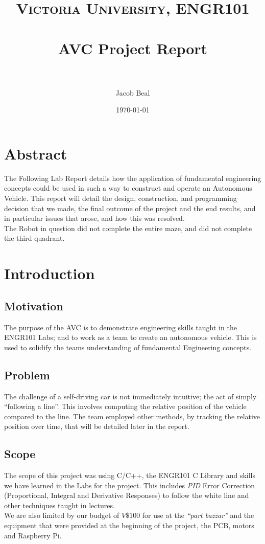 \documentclass[paper=a4, fontsize=11pt]{scrartcl} %
\title{
\normalfont\normalsize
\textsc{Victoria University, ENGR101} \\ [25pt] %
\horrule{0.5pt} \\[0.4cm] %
\huge AVC Project Report\\ %
\horrule{2pt} \\[0.5cm] %
}
\author{Jacob Beal} %
\date{\normalsize\today} %
\numberwithin{equation}{section} %
\numberwithin{figure}{section} %
\begin{document}
\maketitle
\pagebreak
\tableofcontents
\pagebreak

\section{Abstract}
The Following Lab Report details how the application of fundamental engineering
concepts could be used in such a way to construct and operate an Autonomous
Vehicle. This report will detail the design, construction, and programming
decision that we made, the final outcome of the project and the end results,
and in particular issues that arose, and how this was resolved.\\

The Robot in question did not complete the entire maze, and did not complete the
third quadrant.





\section{Introduction}
\subsection{Motivation}
The purpose of the AVC is to demonstrate engineering skills taught in the
ENGR101 Labs; and to work as a team to create an autonomous vehicle. This is
used to solidify the teams understanding of fundamental Engineering concepts.
\subsection{Problem}
The challenge of a self-driving car is not immediately intuitive; the act of %
simply ``following a line''. This involves computing the relative position of
the vehicle compared to the line. The team employed other methods, by tracking
the relative position over time, that will be detailed later in the report.
\subsection{Scope}
The scope of this project was using C/C++, the ENGR101 C Library and skills we
have learned in the Labs for the project. This includes \textit{PID} Error
Correction (Proportional, Integral and Derivative Responses) to follow the 
white line and other techniques taught in lectures.\\
We are also limited by our budget of $V\$100$ for use at the \textit{``part
bazzar''} and the equipment that were provided at the beginning of the
project, the PCB, motors and Raspberry Pi.
\end{document}
